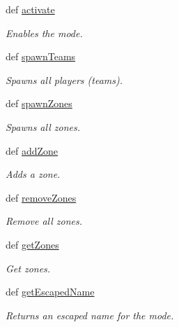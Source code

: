 \begin{DoxyCompactItemize}
def \hyperlink{class_mode_1_1_mode_a6cf2ccffddfb377d9abdb116ba74bd3b}{activate}
\begin{DoxyCompactList}\small\item\em Enables the mode. \item\end{DoxyCompactList}\item 
def \hyperlink{class_mode_1_1_mode_a356d4927de4587c311227527e55eaada}{spawnTeams}
\begin{DoxyCompactList}\small\item\em Spawns all players (teams). \item\end{DoxyCompactList}\item 
def \hyperlink{class_mode_1_1_mode_a152e7d0cf7d765c82810d69662f8af40}{spawnZones}
\begin{DoxyCompactList}\small\item\em Spawns all zones. \item\end{DoxyCompactList}\item 
def \hyperlink{class_mode_1_1_mode_ae24a354b3b872ac4d0c12c43cec5f475}{addZone}
\begin{DoxyCompactList}\small\item\em Adds a zone. \item\end{DoxyCompactList}\item 
def \hyperlink{class_mode_1_1_mode_ac957f54f8b2dae24ec1d72af3d53f0ef}{removeZones}
\begin{DoxyCompactList}\small\item\em Remove all zones. \item\end{DoxyCompactList}\item 
def \hyperlink{class_mode_1_1_mode_a2bf7c935b63449284449c845ad6b5321}{getZones}
\begin{DoxyCompactList}\small\item\em Get zones. \item\end{DoxyCompactList}\item 
def \hyperlink{class_mode_1_1_mode_ac1d907aa0ec93e0908aa3fa2cac0bde7}{getEscapedName}
\begin{DoxyCompactList}\small\item\em Returns an escaped name for the mode. \item\end{DoxyCompactList}\item 

\end{DoxyCompactItemize}
